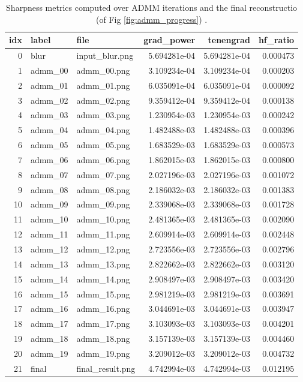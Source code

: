 \documentclass{article}
\theoremstyle{definition}
\begin{document}
\begin{table}[!h]
\centering
\caption{Sharpness metrics computed over ADMM iterations and the final reconstructio (of Fig \ref{fig:admm_progress}) .}
\label{tab:metrics_table_eval}
\begin{tabular}{r l l r r r}
\toprule
\textbf{idx} & \textbf{label} & \textbf{file} &
\textbf{grad\_power} & \textbf{tenengrad} & \textbf{hf\_ratio} \\
\midrule
0  & blur     & input\_blur.png     & 5.694281e{-04} & 5.694281e{-04} & 0.000473 \\
1  & admm\_00 & admm\_00.png        & 3.109234e{-04} & 3.109234e{-04} & 0.000203 \\
2  & admm\_01 & admm\_01.png        & 6.035091e{-04} & 6.035091e{-04} & 0.000092 \\
3  & admm\_02 & admm\_02.png        & 9.359412e{-04} & 9.359412e{-04} & 0.000138 \\
4  & admm\_03 & admm\_03.png        & 1.230954e{-03} & 1.230954e{-03} & 0.000242 \\
5  & admm\_04 & admm\_04.png        & 1.482488e{-03} & 1.482488e{-03} & 0.000396 \\
6  & admm\_05 & admm\_05.png        & 1.683529e{-03} & 1.683529e{-03} & 0.000573 \\
7  & admm\_06 & admm\_06.png        & 1.862015e{-03} & 1.862015e{-03} & 0.000800 \\
8  & admm\_07 & admm\_07.png        & 2.027196e{-03} & 2.027196e{-03} & 0.001072 \\
9  & admm\_08 & admm\_08.png        & 2.186032e{-03} & 2.186032e{-03} & 0.001383 \\
10 & admm\_09 & admm\_09.png        & 2.339068e{-03} & 2.339068e{-03} & 0.001728 \\
11 & admm\_10 & admm\_10.png        & 2.481365e{-03} & 2.481365e{-03} & 0.002090 \\
12 & admm\_11 & admm\_11.png        & 2.609914e{-03} & 2.609914e{-03} & 0.002448 \\
13 & admm\_12 & admm\_12.png        & 2.723556e{-03} & 2.723556e{-03} & 0.002796 \\
14 & admm\_13 & admm\_13.png        & 2.822662e{-03} & 2.822662e{-03} & 0.003120 \\
15 & admm\_14 & admm\_14.png        & 2.908497e{-03} & 2.908497e{-03} & 0.003420 \\
16 & admm\_15 & admm\_15.png        & 2.981219e{-03} & 2.981219e{-03} & 0.003691 \\
17 & admm\_16 & admm\_16.png        & 3.044691e{-03} & 3.044691e{-03} & 0.003947 \\
18 & admm\_17 & admm\_17.png        & 3.103093e{-03} & 3.103093e{-03} & 0.004201 \\
19 & admm\_18 & admm\_18.png        & 3.157139e{-03} & 3.157139e{-03} & 0.004460 \\
20 & admm\_19 & admm\_19.png        & 3.209012e{-03} & 3.209012e{-03} & 0.004732 \\
21 & final    & final\_result.png   & 4.742994e{-03} & 4.742994e{-03} & 0.012195 \\
\bottomrule
\end{tabular}
\end{table}
\end{document}
